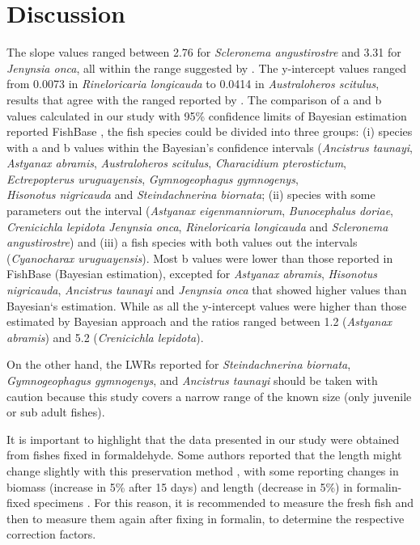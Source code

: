 \documentclass[authoryear,preprint,review,12pt]{elsarticle} %
\begin{document}
\section{ Discussion}

The slope values ranged between 2.76 for \textit{Scleronema angustirostre }and 3.31 for \textit{Jenynsia onca}, all within the range suggested by \cite{pauly1997bee}. The y-intercept values ranged from  0.0073 in \textit{Rineloricaria longicauda} to 0.0414 in \textit{Australoheros scitulus}, results that agree with the ranged reported by \cite{froese2006cube}. 
\justifying
The comparison of a and b values calculated in our study with 95\% confidence limits of Bayesian estimation reported  FishBase \citep{froese2016d}, the fish species could be divided into three groups: (i) species with a and b values within the Bayesian's confidence intervals  (\textit{Ancistrus taunayi}, \textit{Astyanax abramis}, \textit{Australoheros scitulus}, \textit{Characidium pterostictum}, \textit{Ectrepopterus uruguayensis}, \textit{Gymnogeophagus gymnogenys}, \\
\textit{Hisonotus nigricauda} and\textit{ Steindachnerina biornata}; (ii) species with some parameters out the interval (\textit{Astyanax eigenmanniorum}, \textit{Bunocephalus doriae}, \textit{Crenicichla lepidota} \textit{Jenynsia onca}, \textit{Rineloricaria longicauda} and \textit{Scleronema angustirostre}) and (iii) a fish species with both values out the intervals (\textit{Cyanocharax uruguayensis}).  Most b values were lower than those reported in FishBase (Bayesian estimation), excepted for \textit{Astyanax abramis}, \textit{Hisonotus nigricauda}, \textit{Ancistrus taunayi} and \textit{Jenynsia onca } that showed higher values than Bayesian`s estimation.  While as all the y-intercept values were higher than those estimated by Bayesian approach and the ratios ranged between 1.2 (\textit{Astyanax abramis}) and 5.2 (\textit{Crenicichla lepidota}). 



On the other hand, the LWRs reported for \textit{Steindachnerina biornata}, \textit{Gymnogeophagus gymnogenys}, and \textit{Ancistrus taunayi} should be taken with caution because this study covers a narrow range of the known size (only juvenile or sub adult fishes).

It is important to highlight that the data presented in our study were obtained from fishes fixed in formaldehyde. Some authors reported that the length might change slightly with this preservation method \citep{ajah_effects_2003,al-hassan_effect_2000}, with some reporting changes in biomass (increase in 5\% after 15 days) and length (decrease in 5\%) in formalin-fixed specimens \citep{nielsen_fisheries_1983} . For this reason, it is recommended to measure the fresh fish and then to measure them again after fixing in formalin, to determine the respective correction factors. 
\end{document}

